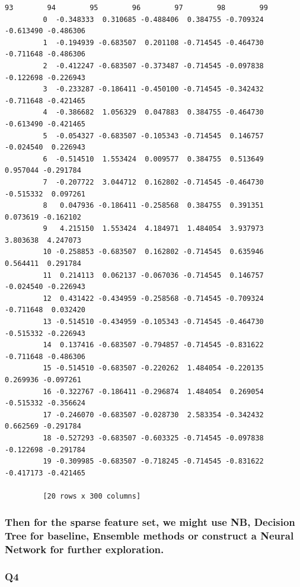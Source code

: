 \documentclass[11pt]{article}
\begin{document}
\begin{Verbatim}[commandchars=\\\{\}]
                   93        94        95        96        97        98        99  
         0  -0.348333  0.310685 -0.488406  0.384755 -0.709324 -0.613490 -0.486306  
         1  -0.194939 -0.683507  0.201108 -0.714545 -0.464730 -0.711648 -0.486306  
         2  -0.412247 -0.683507 -0.373487 -0.714545 -0.097838 -0.122698 -0.226943  
         3  -0.233287 -0.186411 -0.450100 -0.714545 -0.342432 -0.711648 -0.421465  
         4  -0.386682  1.056329  0.047883  0.384755 -0.464730 -0.613490 -0.421465  
         5  -0.054327 -0.683507 -0.105343 -0.714545  0.146757 -0.024540  0.226943  
         6  -0.514510  1.553424  0.009577  0.384755  0.513649  0.957044 -0.291784  
         7  -0.207722  3.044712  0.162802 -0.714545 -0.464730 -0.515332  0.097261  
         8   0.047936 -0.186411 -0.258568  0.384755  0.391351  0.073619 -0.162102  
         9   4.215150  1.553424  4.184971  1.484054  3.937973  3.803638  4.247073  
         10 -0.258853 -0.683507  0.162802 -0.714545  0.635946  0.564411  0.291784  
         11  0.214113  0.062137 -0.067036 -0.714545  0.146757 -0.024540 -0.226943  
         12  0.431422 -0.434959 -0.258568 -0.714545 -0.709324 -0.711648  0.032420  
         13 -0.514510 -0.434959 -0.105343 -0.714545 -0.464730 -0.515332 -0.226943  
         14  0.137416 -0.683507 -0.794857 -0.714545 -0.831622 -0.711648 -0.486306  
         15 -0.514510 -0.683507 -0.220262  1.484054 -0.220135  0.269936 -0.097261  
         16 -0.322767 -0.186411 -0.296874  1.484054  0.269054 -0.515332 -0.356624  
         17 -0.246070 -0.683507 -0.028730  2.583354 -0.342432  0.662569 -0.291784  
         18 -0.527293 -0.683507 -0.603325 -0.714545 -0.097838 -0.122698 -0.291784  
         19 -0.309985 -0.683507 -0.718245 -0.714545 -0.831622 -0.417173 -0.421465  
         
         [20 rows x 300 columns]
\end{Verbatim}
            
    \subsubsection*{Then for the sparse feature set, we might use NB,
Decision Tree for baseline, Ensemble methods or construct a Neural
Network for further
exploration.}\label{then-for-the-sparse-feature-set-we-might-use-nb-decision-tree-for-baseline-ensemble-methods-or-construct-a-neural-network-for-further-exploration.}\mbox{}

    \subsubsection*{Q4}\label{q4}
\end{document}
